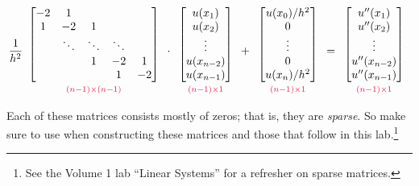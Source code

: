 \begin{align}
\frac{1}{h^2}
\begin{array}{c}
\begin{bmatrix}
-2 & 1 & \\
1 & -2 & 1  \\
& \ddots & \ddots & \ddots \\
& & 1 & -2 & 1 \\
& & & 1 & -2
\end{bmatrix}\\
{\scriptstyle\textcolor{red}{(n-1)\times(n-1)}}
\end{array}\cdot
\begin{array}{c}
\begin{bmatrix}
u(x_1) \\ u(x_2)\\ \vdots  \\ u(x_{n-2}) \\ u(x_{n-1})
\end{bmatrix}\\
{\scriptstyle\textcolor{red}{(n-1)\times1}}
\end{array} +
\begin{array}{c}
\begin{bmatrix}
u(x_0)/h^2 \\ 0 \\ \vdots  \\ 0 \\ u(x_n)/h^2
\end{bmatrix}\\
{\scriptstyle\textcolor{red}{(n-1)\times1}}
 \end{array} =
 \begin{array}{c}
\begin{bmatrix}
u''(x_1) \\ u''(x_2)\\ \vdots  \\ u''(x_{n-2}) \\ u''(x_{n-1})
\end{bmatrix}\\
{\scriptstyle\textcolor{red}{(n-1)\times1}}
\label{finitedifference2:upp}
\end{array}
\end{align}

Each of these matrices consists mostly of zeros; that is, they are \textit{sparse}.
So make sure to use  when constructing these matrices and those that follow in this lab.\footnote{See the Volume 1 lab ``Linear Systems'' for a refresher on sparse matrices.}


